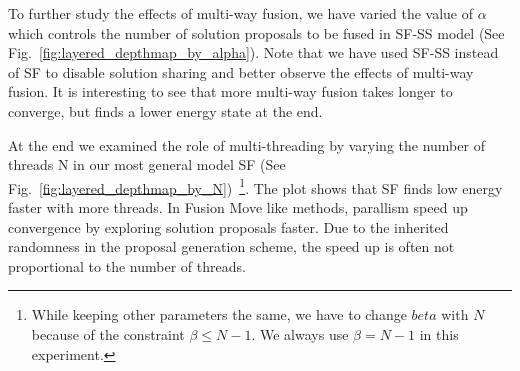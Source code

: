 %
To further study the effects of multi-way fusion, we have varied the
value of $\alpha$ which controls the number of solution proposals to be
fused in SF-SS model (See
Fig.~\ref{fig:layered_depthmap_by_alpha}). Note that we have used SF-SS
instead of SF to disable solution sharing and better observe the effects
of multi-way fusion.
It is interesting to see that more multi-way fusion takes longer to
converge, but finds a lower energy state at the end.

At the end we examined the role of multi-threading by varying the number of threads N in our most general model SF (See Fig.~\ref{fig:layered_depthmap_by_N})~\footnote{While keeping other parameters the same, we have to change $beta$ with $N$ because of the constraint $\beta \leq N-1$. We always use $\beta = N-1$ in this experiment.}. The plot shows that SF finds low energy faster with more threads. In Fusion Move like methods, parallism speed up convergence by exploring solution proposals faster. Due to the inherited randomness in the proposal generation scheme, the speed up is often not proportional to the number of threads.
